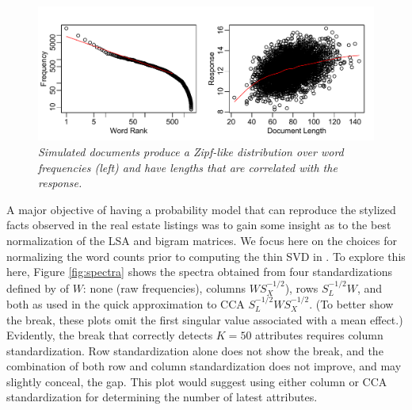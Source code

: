 \documentclass[12pt]{article}
\begin{document}
\begin{figure}
\caption{ \label{fig:zipfcorr}
{ \sl Simulated documents produce a Zipf-like distribution over word frequencies (left) and have lengths that are correlated with the response.}}
 \centerline{
 \vspace{0.1in}
 \includegraphics[width=7.5in]{figures/zipfcorr} }
 \end{figure}

 A major objective of having a probability model that can reproduce the stylized facts observed in the real estate listings was to gain some insight as to the best normalization of the LSA and bigram matrices.  We focus here on the choices for normalizing the word counts prior to computing the thin SVD in .   To explore this here, Figure \ref{fig:spectra} shows the spectra obtained from four standardizations defined by   of $W$: none (raw frequencies), columns $WS_X^{-1/2}$), rows $S_L^{-1/2}W$, and both as used in the quick approximation to CCA  $S_L^{-1/2}WS_X^{-1/2}$.  (To better show the break, these plots omit the first singular value associated with a mean effect.) Evidently, the break that correctly detects $K=50$ attributes requires column standardization.  Row standardization alone does not show the break, and the combination of both row and column standardization does not improve, and may slightly conceal, the gap.  This plot would suggest using either column or CCA standardization for determining the number of latest attributes.
 
\end{document}
